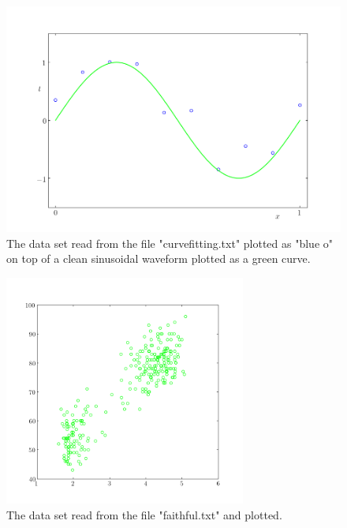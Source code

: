 \documentclass[conference]{IEEEtran}
\begin{document}
\begin{figure}[p!]
\centerline{\includegraphics[trim=20 0 40 0, clip, width=\columnwidth]{Figure_6.png}}
\caption{The data set read from the file "curvefitting.txt" plotted as "blue o" on top of a clean sinusoidal waveform plotted as a green curve.}
\label{fig:noisysinfile}
\end{figure}

\begin{figure}[p!]
\centerline{\includegraphics[trim=0 0 0 0, clip, width=300]{Figure_7.png}}
\caption{The data set read from the file "faithful.txt" and plotted.}
\label{fig:oldfaithful}
\end{figure}
\end{document}
